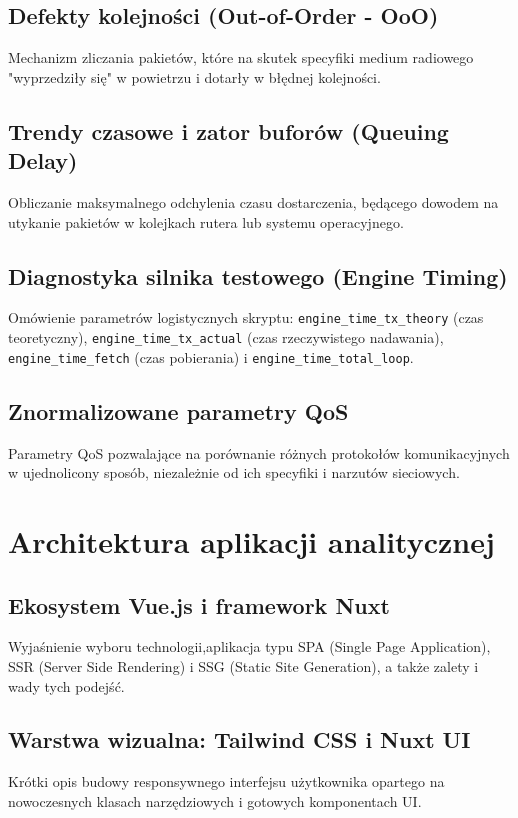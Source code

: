 \section{Defekty kolejności (Out-of-Order - OoO)}
Mechanizm zliczania pakietów, które na skutek specyfiki medium radiowego "wyprzedziły się" w powietrzu i dotarły w błędnej kolejności.

\section{Trendy czasowe i zator buforów (Queuing Delay)}
Obliczanie maksymalnego odchylenia czasu dostarczenia, będącego dowodem na utykanie pakietów w kolejkach rutera lub systemu operacyjnego.

\section{Diagnostyka silnika testowego (Engine Timing)}
Omówienie parametrów logistycznych skryptu: \texttt{engine\_time\_tx\_theory} (czas teoretyczny), \texttt{engine\_time\_tx\_actual} (czas rzeczywistego nadawania), \texttt{engine\_time\_fetch} (czas pobierania) i \texttt{engine\_time\_total\_loop}.

\section{Znormalizowane parametry QoS}
Parametry QoS pozwalające na porównanie różnych protokołów komunikacyjnych w ujednolicony sposób, niezależnie od ich specyfiki i narzutów sieciowych.

\chapter{Architektura aplikacji analitycznej}

\section{Ekosystem Vue.js i framework Nuxt}
Wyjaśnienie wyboru technologii,aplikacja typu SPA (Single Page Application), SSR (Server Side Rendering) i SSG (Static Site Generation), a także zalety i wady tych podejść.

\section{Warstwa wizualna: Tailwind CSS i Nuxt UI}
Krótki opis budowy responsywnego interfejsu użytkownika opartego na nowoczesnych klasach narzędziowych i gotowych komponentach UI.

